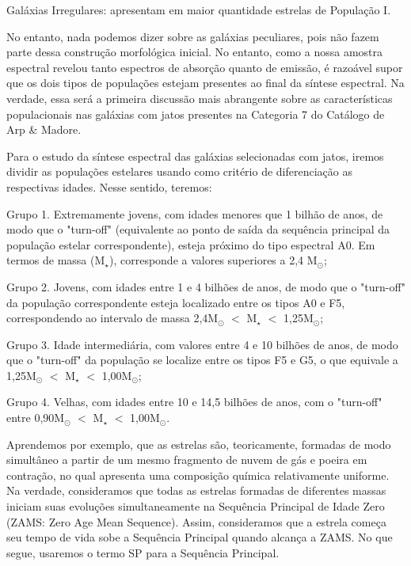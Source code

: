 Galáxias Irregulares: apresentam em maior quantidade estrelas de População I.

No entanto, nada podemos dizer sobre as galáxias peculiares, pois não fazem parte dessa construção morfológica inicial. No entanto, como a nossa amostra espectral revelou tanto espectros de absorção quanto de emissão, é razoável supor que os dois tipos de populações estejam presentes ao final da síntese espectral. Na verdade, essa será a primeira discussão mais abrangente sobre as características populacionais nas galáxias com jatos presentes na Categoria 7 do Catálogo de Arp \& Madore.

Para o estudo da síntese espectral das galáxias selecionadas com jatos, iremos dividir as populações estelares usando como critério de diferenciação as respectivas idades. Nesse sentido, teremos:

Grupo 1. Extremamente jovens, com idades menores que 1 bilhão de anos, de modo que o "turn-off" (equivalente ao ponto de saída da sequência principal da população estelar correspondente), esteja próximo do tipo espectral A0. Em termos de massa (M$_\star$), corresponde a valores superiores a 2,4 M$_{\odot}$;

Grupo 2. Jovens, com idades entre 1 e 4 bilhões de anos, de modo que o "turn-off" da população correspondente esteja localizado entre os tipos A0 e F5, correspondendo ao intervalo de massa 2,4M$_{\odot}$ $<$ M$_{\star}$ $<$ 1,25M$_{\odot}$;

Grupo 3. Idade intermediária, com valores entre 4 e 10 bilhões de anos, de modo que o "turn-off" da população se localize entre os tipos F5 e G5, o que equivale a 1,25M$_{\odot}$ $<$ M$_{\star}$ $<$ 1,00M$_{\odot}$;

Grupo 4. Velhas, com idades entre 10 e 14,5 bilhões de anos, com o "turn-off" entre 0,90M$_{\odot}$ $<$ M$_{\star}$ $<$ 1,00M$_{\odot}$.

Aprendemos por exemplo, \cite{maciel1999amm} que as estrelas são, teoricamente, formadas de modo simultâneo a partir de um mesmo fragmento de nuvem de gás e poeira em contração, no qual apresenta uma composição química relativamente uniforme. Na verdade, consideramos que todas as estrelas formadas de diferentes massas iniciam suas evoluções simultaneamente na Sequência Principal de Idade Zero (ZAMS: Zero Age Mean Sequence). Assim, consideramos que a estrela começa seu tempo de vida sobe a Sequência Principal quando alcança a ZAMS. No que segue, usaremos o termo SP para a Sequência Principal.

